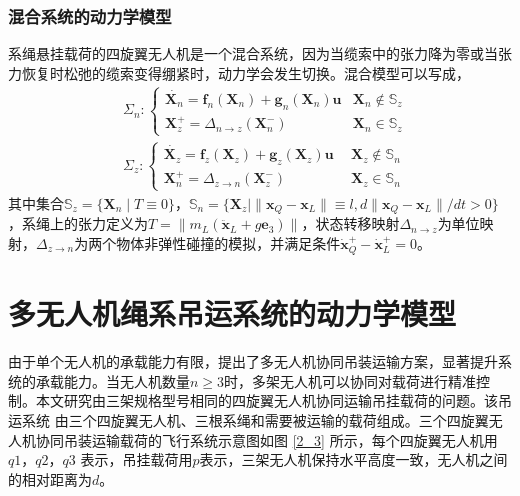 \documentclass[lang=chs, degree=master, blindreview=false, winfonts=true]{yanputhesis}
\begin{document}
\subsubsection{混合系统的动力学模型}
系绳悬挂载荷的四旋翼无人机是一个混合系统，因为当缆索中的张力降为零或当张力恢复时松弛的缆索变得绷紧时，动力学会发生切换。混合模型可以写成，
\begin{equation}
	\left.\begin{aligned}&\Sigma_{n}:\left\{\begin{array}{ll}\dot{\bm X_n}=\bm f_n(\bm X_n)+\bm g_n(\bm X_n)\bm u  &\bm X_n\notin \mathbb{S}_z\\\bm X_z^+=\Delta_{n\to z}(\bm X_n^-)  &\bm X_n\in \mathbb{S}_z\end{array}\right.\\&\Sigma_{z}:\left\{\begin{array}{ll}\dot{\bm X_z}=\bm f_z(\bm X_z)+\bm g_z(\bm X_z)\bm u \ \ &\bm X_z\notin \mathbb{S}_n\\\bm X_n^+=\Delta_{z\to n}(\bm X_z^-) \ &\bm X_z\in \mathbb{S}_n\end{array}\right.\end{aligned}\right.
\end{equation}
其中集合$\mathbb S_z = \{ \bm X_n \mid  T \equiv 0 \}$，$\mathbb S_n = \{ \bm X_z \mid \|\bm x_Q - \bm x_L\| \equiv l, d \|\bm x_Q - \bm x_L\| /dt> 0 \}$，系绳上的张力定义为$T = \|m_L (\ddot{\bm x}_L + g\bm{e}_3)\|$，状态转移映射$\Delta_{n\to z}$为单位映射，$\Delta_{z\to n}$为两个物体非弹性碰撞的模拟，并满足条件$\dot{\bm x}_Q^+-\dot{\bm x}_L^+=0$。

\section{多无人机绳系吊运系统的动力学模型}
由于单个无人机的承载能力有限，提出了多无人机协同吊装运输方案，显著提升系统的承载能力。当无人机数量$n\geq3$时，多架无人机可以协同对载荷进行精准控制。本文研究由三架规格型号相同的四旋翼无人机协同运输吊挂载荷的问题。该吊运系统
由三个四旋翼无人机、三根系绳和需要被运输的载荷组成。三个四旋翼无人机协同吊装运输载荷的飞行系统示意图如图 \ref{2_3} 所示，每个四旋翼无人机用
$q1$，$q2$，$q3$ 表示，吊挂载荷用$p$表示，三架无人机保持水平高度一致，无人机之间的相对距离为$d$。
\end{document}
